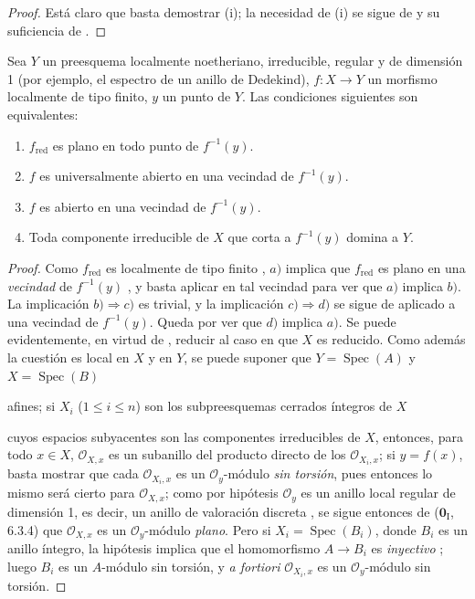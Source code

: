 \begin{proof}
Está claro que basta demostrar (i); la necesidad de (i) se sigue de  y su suficiencia de .
\end{proof}

\begin{proposition}[14.3.8]
\label{IV.14.3.8}
Sea $Y$ un preesquema localmente noetheriano, irreducible, regular y de dimensión 1 (por ejemplo, el espectro de un anillo de Dedekind), $f:X\to Y$ un morfismo localmente de tipo finito, $y$ un punto de $Y$.
Las condiciones siguientes son equivalentes:
\begin{enumerate}[label=\emph{\alph*)}]
  \item $f_{\mathrm{red}}$ es plano en todo punto de $f^{-1}(y)$.
  \item $f$ es universalmente abierto en una vecindad de $f^{-1}(y)$.
  \item $f$ es abierto en una vecindad de $f^{-1}(y)$.
  \item Toda componente irreducible de $X$ que corta a $f^{-1}(y)$ domina a $Y$.
\end{enumerate}
\end{proposition}

\begin{proof}
Como $f_{\mathrm{red}}$ es localmente de tipo finito , $a)$ implica que $f_{\mathrm{red}}$ es plano en una \emph{vecindad} de $f^{-1}(y)$ , y basta aplicar  en tal vecindad para ver que $a)$ implica $b)$.
La implicación $b)\Rightarrow c)$ es trivial, y la implicación $c)\Rightarrow d)$ se sigue de  aplicado a una vecindad de $f^{-1}(y)$.
Queda por ver que $d)$ implica $a)$.
Se puede evidentemente, en virtud de , reducir al caso en que $X$ es reducido.
Como además la cuestión es local en $X$ y en $Y$, se puede suponer que $Y=\operatorname{Spec}(A)$ y $X=\operatorname{Spec}(B)$

afines; si $X_i$ ($1\leq i\leq n$) son los subpreesquemas cerrados íntegros de $X$ 


cuyos espacios subyacentes son las componentes irreducibles de $X$, entonces, para todo $x\in X$, $\mathcal O_{X,x}$ es un subanillo del producto directo de los $\mathcal O_{X_i,x}$; si $y=f(x)$, basta mostrar que cada $\mathcal O_{X_i,x}$ es un $\mathcal O_y$-módulo \emph{sin torsión}, pues entonces lo mismo será cierto para $\mathcal O_{X,x}$; como por hipótesis $\mathcal O_y$ es un anillo local regular de dimensión 1, es decir, un anillo de valoración discreta , se sigue entonces de ($\mathbf{0}_{\mathrm I}$, 6.3.4) que $\mathcal O_{X,x}$ es un $\mathcal O_y$-módulo \emph{plano}.
Pero si $X_i=\operatorname{Spec}(B_i)$, donde $B_i$ es un anillo íntegro, la hipótesis implica que el homomorfismo $A\to B_i$ es \emph{inyectivo} ; luego $B_i$ es un $A$-módulo sin torsión, y \emph{a fortiori} $\mathcal O_{X_i,x}$ es un $\mathcal O_y$-módulo sin torsión.
\end{proof}

